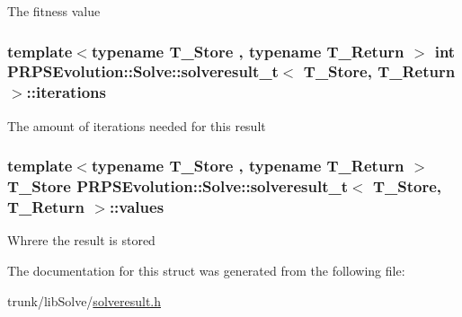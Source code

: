 The fitness value \hypertarget{struct_p_r_p_s_evolution_1_1_solve_1_1solveresult__t_ae8b371ad4166477d279f6a8936757bf9}{
\subsubsection[{iterations}]{\setlength{\rightskip}{0pt plus 5cm}template$<$typename T\-\_\-\-Store , typename T\-\_\-\-Return $>$ int {\bf P\-R\-P\-S\-Evolution\-::\-Solve\-::solveresult\-\_\-t}$<$ T\-\_\-\-Store, T\-\_\-\-Return $>$\-::iterations}}\label{struct_p_r_p_s_evolution_1_1_solve_1_1solveresult__t_ae8b371ad4166477d279f6a8936757bf9}
The amount of iterations needed for this result \hypertarget{struct_p_r_p_s_evolution_1_1_solve_1_1solveresult__t_a058c43621839d9bc61b96e69f8d5c778}{
\subsubsection[{values}]{\setlength{\rightskip}{0pt plus 5cm}template$<$typename T\-\_\-\-Store , typename T\-\_\-\-Return $>$ T\-\_\-\-Store {\bf P\-R\-P\-S\-Evolution\-::\-Solve\-::solveresult\-\_\-t}$<$ T\-\_\-\-Store, T\-\_\-\-Return $>$\-::values}}\label{struct_p_r_p_s_evolution_1_1_solve_1_1solveresult__t_a058c43621839d9bc61b96e69f8d5c778}
Whrere the result is stored 

The documentation for this struct was generated from the following file\-:\begin{DoxyCompactItemize}
\item 
trunk/lib\-Solve/\hyperlink{solveresult_8h}{solveresult.\-h}\end{DoxyCompactItemize}
